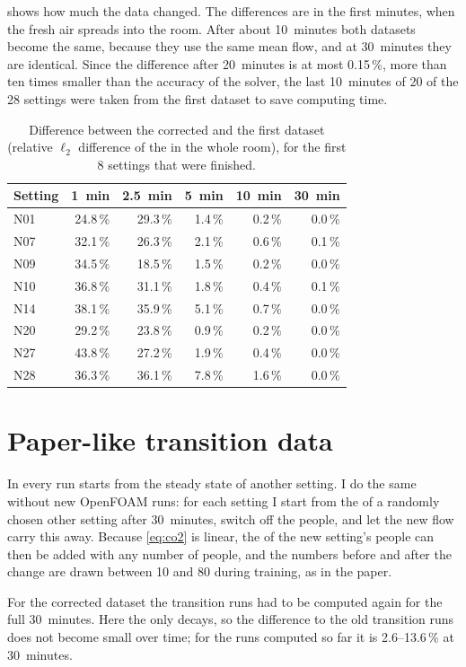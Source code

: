 shows how much the data changed. The differences are in the first minutes, when the fresh air
spreads into the room. After about 10~minutes both datasets become the same, because they use the same mean
flow, and at 30~minutes they are identical. Since the difference after 20~minutes is at most 0.15\,\%, more
than ten times smaller than the accuracy of the solver, the last 10~minutes of 20 of the 28 settings were taken from
the first dataset to save computing time.

\begin{table}[h]
  \centering
  \caption{Difference between the corrected and the first dataset (relative $\ell_2$ difference of the
  \cotwo{} in the whole room), for the first 8 settings that were finished.}
  \label{tab:v3v2}
  \begin{tabular}{lrrrrr}
    \toprule
    Setting & 1~min & 2.5~min & 5~min & 10~min & 30~min\\
    \midrule
    N01 & 24.8\,\% & 29.3\,\% & 1.4\,\% & 0.2\,\% & 0.0\,\%\\
    N07 & 32.1\,\% & 26.3\,\% & 2.1\,\% & 0.6\,\% & 0.1\,\%\\
    N09 & 34.5\,\% & 18.5\,\% & 1.5\,\% & 0.2\,\% & 0.0\,\%\\
    N10 & 36.8\,\% & 31.1\,\% & 1.8\,\% & 0.4\,\% & 0.1\,\%\\
    N14 & 38.1\,\% & 35.9\,\% & 5.1\,\% & 0.7\,\% & 0.0\,\%\\
    N20 & 29.2\,\% & 23.8\,\% & 0.9\,\% & 0.2\,\% & 0.0\,\%\\
    N27 & 43.8\,\% & 27.2\,\% & 1.9\,\% & 0.4\,\% & 0.0\,\%\\
    N28 & 36.3\,\% & 36.1\,\% & 7.8\,\% & 1.6\,\% & 0.0\,\%\\
    \bottomrule
  \end{tabular}
\end{table}

\section{Paper-like transition data}
In \citet{bian2025} every run starts from the steady state of another setting. I do the same without new
OpenFOAM runs: for each setting I start from the \cotwo{} of a randomly chosen other setting after 30~minutes,
switch off the people, and let the new flow carry this \cotwo{} away. Because \cref{eq:co2} is linear, the
\cotwo{} of the new setting's people can then be added with any number of people, and the numbers before and
after the change are drawn between 10 and 80 during training, as in the paper.

For the corrected dataset the transition runs had to be computed again for the full 30~minutes. Here the
\cotwo{} only decays, so the difference to the old transition runs does not become small over time; for the
runs computed so far it is 2.6--13.6\,\% at 30~minutes. 
